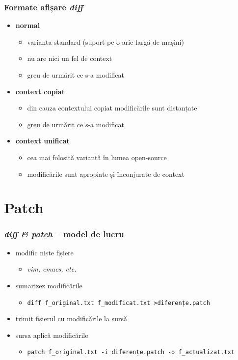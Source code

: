 \documentclass{beamer}
\begin{document}
\begin{frame}
  \frametitle{\textbf Formate afișare \textit{diff}}
  \begin{itemize}
  \item \textbf{normal}
    \begin{itemize}
    \item varianta standard (suport pe o arie largă de mașini)
    \item nu are nici un fel de context
    \item greu de urmărit ce s-a modificat
    \end{itemize}

  \item \textbf{context copiat}
    \begin{itemize}
    \item din cauza contextului copiat modificările sunt distanțate
    \item greu de urmărit ce s-a modificat
    \end{itemize}

  \item \textbf{context unificat}
    \begin{itemize}
    \item \alert{cea mai folosită variantă în lumea open-source}
    \item modificările sunt apropiate și înconjurate de context
    \end{itemize}
  \end{itemize}
\end{frame}



\section{Patch}
\frame{\tableofcontents[currentsection]}


\begin{frame}
  \frametitle{\textit{diff \& patch} – model de lucru}
  \begin{itemize}[<+->]
  \item modific niște fișiere
    \begin{itemize}
      \item \textit{vim, emacs, etc.}
    \end{itemize}
  \item sumarizez modificările
    \begin{itemize}
    \item \scriptsize{\texttt{diff f\_original.txt f\_modificat.txt \textgreater diferențe.patch}}
    \end{itemize}
  \item trimit fișierul cu modificările la sursă
  \item sursa aplică modificările
    \begin{itemize}
    \item \scriptsize{\texttt{patch f\_original.txt -i diferențe.patch -o f\_actualizat.txt}}
    \end{itemize}

  \end{itemize}
\end{frame}
\end{document}
